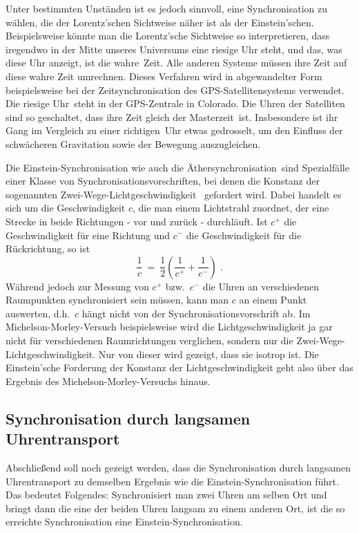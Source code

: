 Unter bestimmten Unst\"anden ist es jedoch sinnvoll, eine
Synchronisation zu w\"ahlen, die der Lorentz'schen Sichtweise
n\"aher ist als der Einstein'schen. Beispielsweise k\"onnte man
die Lorentz'sche Sichtweise so interpretieren, dass iregendwo in der Mitte
unseres Universums eine riesige Uhr steht, und das, was diese Uhr anzeigt,
ist die \glqq wahre\grqq\ Zeit. Alle anderen Systeme m\"ussen ihre Zeit auf
diese wahre Zeit umrechnen. Dieses Verfahren wird in abgewandelter Form
beispielsweise bei der Zeitsynchronisation des GPS-Satellitensystems verwendet.
Die \glqq riesige Uhr\grqq\ steht in der GPS-Zentrale in Colorado. Die 
Uhren der Satelliten sind so geschaltet, dass ihre Zeit gleich der 
\glqq Masterzeit\grqq\ ist. Insbesondere ist ihr Gang im 
Vergleich zu einer \glqq richtigen\grqq\
Uhr etwas gedrosselt, um den Einfluss der schw\"acheren Gravitation sowie
der Bewegung auszugleichen.

Die Einstein-Synchronisation wie auch die 
\glqq \"Athersynchronisation\grqq\
sind Spezialf\"alle einer Klasse von Synchronisationsvorschriften, bei
denen die Konstanz der sogenannten \glqq Zwei-Wege-Lichtgeschwindigkeit\grqq\
%
gefordert wird. Dabei handelt es sich um die Geschwindigkeit $c$, die
man einem Lichtstrahl zuordnet, der eine Strecke in beide Richtungen -
vor und zur\"uck - durchl\"auft. Ist $c^+$ die Geschwindigkeit f\"ur
eine Richtung und $c^-$ die Geschwindigkeit f\"ur die R\"uckrichtung,
so ist
\[   \frac{1}{c} ~=~ \frac{1}{2} \left( \frac{1}{c^+} + \frac{1}{c^-}
                  \right)   \;.    \]
W\"ahrend jedoch zur Messung von $c^+$ bzw.\ $c^-$ die Uhren an 
verschiedenen
Raumpunkten synchronisiert sein m\"ussen, kann man $c$ an einem Punkt
auswerten, d.h.\ $c$ h\"angt nicht von der Synchronisationsvorschrift
ab. Im Michelson-Morley-Versuch 
beispielsweise wird die Lichtgeschwindigkeit
ja gar nicht f\"ur verschiedenen Raumrichtungen verglichen, sondern nur
die Zwei-Wege-Lichtgeschwindigkeit. Nur von dieser wird gezeigt, dass
sie isotrop ist. Die Einstein'sche Forderung der Konstanz der
Lichtgeschwindigkeit geht also \"uber das Ergebnis des 
Michelson-Morley-Versuchs hinaus.

\subsection{Synchronisation durch langsamen Uhrentransport} 

Abschlie\ss end soll noch gezeigt werden, dass die
Synchronisation durch langsamen Uhrentransport zu demselben
Ergebnis wie die Einstein-Synchronisation f\"uhrt. 
Das bedeutet Folgendes: Synchronisiert man zwei Uhren am selben Ort
und bringt dann die eine der beiden Uhren
langsam zu einem anderen Ort, ist die so
erreichte Synchronisation eine Einstein-Synchronisation.

